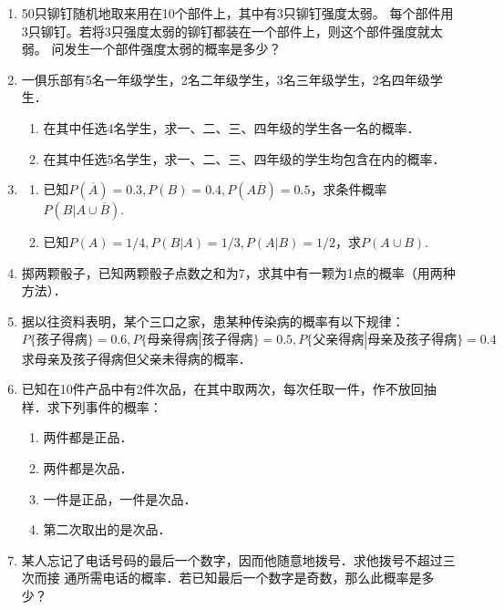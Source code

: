 \documentclass[10pt,a4paper]{article}
\begin{document}
\begin{enumerate}
    \item 50只铆钉随机地取来用在10个部件上，其中有3只铆钉强度太弱。
    每个部件用3只铆钉。若将3只强度太弱的铆钉都装在一个部件上，则这个部件强度就太弱。
    问发生一个部件强度太弱的概率是多少？


    \item 一俱乐部有5名一年级学生，2名二年级学生，3名三年级学生，2名四年级学生．
    \begin{enumerate}
        \item 在其中任选4名学生，求一、二、三、四年级的学生各一名的概率．
        \item 在其中任选5名学生，求一、二、三、四年级的学生均包含在内的概率．
    \end{enumerate}


    \item \begin{enumerate}
        \item 已知$P(\overline{A})=0.3,P(B)=0.4,P(A\overline{B})=0.5$，求条件概率$P(B|A\cup \overline{B})$.
        \item 已知$P(A)=1/4,P(B|A)=1/3,P(A|B)=1/2$，求$P(A\cup B)$.
    \end{enumerate}



    \item 掷两颗骰子，已知两颗骰子点数之和为7，求其中有一颗为1点的概率（用两种方法）．


    \item 据以往资料表明，某个三口之家，患某种传染病的概率有以下规律：
    $$P\{\mbox{孩子得病}\}=0.6,P\{\mbox{母亲得病}|\mbox{孩子得病}\}=0.5,P\{\mbox{父亲得病}|\mbox{母亲及孩子得病}\}=0.4$$
    求母亲及孩子得病但父亲未得病的概率．


    \item 已知在10件产品中有2件次品，在其中取两次，每次任取一件，作不放回抽样．求下列事件的概率：
    \begin{enumerate}
        \item 两件都是正品．
        \item 两件都是次品．
        \item 一件是正品，一件是次品．
        \item 第二次取出的是次品．
    \end{enumerate}


    \item 某人忘记了电话号码的最后一个数字，因而他随意地拨号．求他拨号不超过三次而接
    通所需电话的概率．若已知最后一个数字是奇数，那么此概率是多少？



\end{enumerate}
\end{document}
